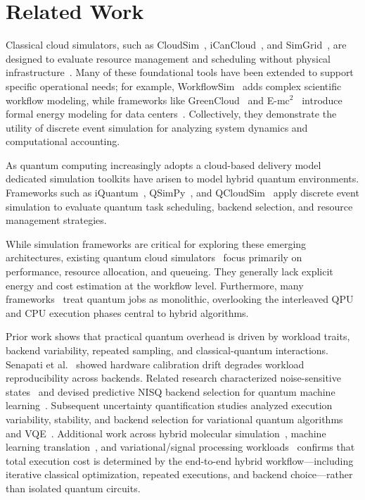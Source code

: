 \section{Related Work}
\label{sec:related-work}

Classical cloud simulators, such as CloudSim~\cite{calheiros2011cloudsim}, iCanCloud~\cite{nunez2012icancloud}, and SimGrid~\cite{casanova2008simgrid}, are designed to evaluate resource management and scheduling without physical infrastructure~\cite{jawaddi2024gymcloudsim}. Many of these foundational tools have been extended to support specific operational needs; for example, WorkflowSim~\cite{chen2012workflowsim} adds complex scientific workflow modeling, while frameworks like GreenCloud~\cite{kliazovich2012greencloud} and E-mc$^2$~\cite{castane2013emc2} introduce formal energy modeling for data centers~\cite{makaratzis2018energymodeling}. Collectively, they demonstrate the utility of discrete event simulation for analyzing system dynamics and computational accounting.

As quantum computing increasingly adopts a cloud-based delivery model dedicated simulation toolkits have arisen to model hybrid quantum environments. Frameworks such as iQuantum~\cite{nguyen2024iquantum}, QSimPy~\cite{qsimpy2024, nguyen2024drlq}, and QCloudSim~\cite{luo2025digital} apply discrete event simulation to evaluate quantum task scheduling, backend selection, and resource management strategies. 

While simulation frameworks are critical for exploring these emerging architectures, existing quantum cloud simulators~\cite{Jones2019-nc, Brennan2022QXToolsAJ, diadamo2021qunetsim} focus primarily on performance, resource allocation, and queueing. They generally lack explicit energy and cost estimation at the workflow level. Furthermore, many frameworks~\cite{bian2023pas, fan2021drascqsim} treat quantum jobs as monolithic, overlooking the interleaved QPU and CPU execution phases central to hybrid algorithms.

Prior work shows that practical quantum overhead is driven by workload traits, backend variability, repeated sampling, and classical-quantum interactions. Senapati et al.~\cite{senapati2023reproducibility} showed hardware calibration drift degrades workload reproducibility across backends. Related research characterized noise-sensitive states~\cite{senapati2023visualization,senapati2025noisy} and devised predictive NISQ backend selection for quantum machine learning~\cite{senapati2024pqml}. Subsequent uncertainty quantification studies analyzed execution variability, stability, and backend selection for variational quantum algorithms and VQE~\cite{senapati2025uqvarqa,senapati2026vqe}. Additional work across hybrid molecular simulation~\cite{abraham2026manybody}, machine learning translation~\cite{zeng2026qbridge}, and variational/signal processing workloads~\cite{senapati2026unified} confirms that total execution cost is determined by the end-to-end hybrid workflow---including iterative classical optimization, repeated executions, and backend choice---rather than isolated quantum circuits.

